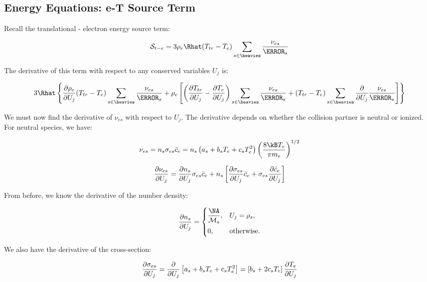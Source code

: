 \documentclass[10pt]{article}
\begin{document}
\begin{flushleft}
\subsection{Energy Equations: e-T Source Term}

Recall the translational - electron energy source term:

\begin{equation}
    \mathcal{S}_{t-e} = 3 \rho_e \Rhat (T_{tr} - T_e) \sum_{s \in \heavies} \frac{\nu_{es}}{\MW_s}
\end{equation}

The derivative of this term with respect to any conserved variables $U_j$ is:

\begin{equation}
    3 \Rhat \bcb{\pd{\rho_e}{U_j} (T_{tr} - T_e) \sum_{s \in \heavies} \frac{\nu_{es}}{\MW_s} + \rho_e \bb{ \bp{\pd{T_{tr}}{U_j} - \pd{T_e}{U_j}}\sum_{s \in \heavies} \frac{\nu_{es}}{\MW_s} + (T_{tr} - T_e) \sum_{s \in \heavies} \pd{}{U_j} \frac{\nu_{es}}{\MW_s} } }
\end{equation}

We must now find the derivative of $\nu_{es}$ with respect to $U_j$. The derivative depends on whether the collision partner is neutral or ionized. For neutral species, we have:

\begin{equation}
    \nu_{es} = n_s \sigma_{es} \bar{c}_e = n_s \bp{a_s + b_s T_e + c_s T_e^2}  \bp{\frac{8 \kB T_e}{\pi m_e}}^{1/2}
\end{equation}


\begin{equation}
    \frac{\partial \nu_{es}}{\partial U_j} = \frac{\partial n_s}{\partial U_j} \sigma_{es} \bar{c}_{e} + n_s \left[ \frac{\partial \sigma_{es}}{\partial U_j} \bar{c}_{e} + \sigma_{es} \frac{\partial \bar{c}_{e}}{\partial U_j} \right]
\end{equation}

From before, we know the derivative of the number density:

\begin{equation}
    \pd{n_s}{U_j} = \begin{cases} \dfrac{\NA}{\mathcal{M}_s}, & U_j = \rho_s, 
    \\[8pt] 0, & \text{otherwise.}
    \end{cases}
\end{equation}

We also have the derivative of the cross-section:

\begin{equation}
    \frac{\partial \sigma_{es}}{\partial U_j} = \frac{\partial }{\partial U_j} \left[ a_s + b_s T_e + c_s T_e^2 \right] = \left[ b_s + 2 c_s T_e \right] \frac{\partial T_e}{\partial U_j}
\end{equation}


\end{flushleft}
\end{document}
